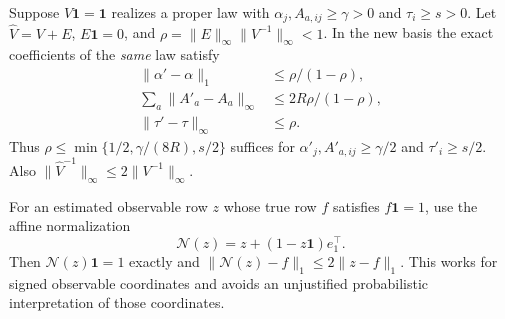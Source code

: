 \begin{lemma}
\label{II:U:lem:learned-basis}
Suppose $V\mathbf1=\mathbf1$ realizes a proper law with
$\alpha_j,A_{a,ij}\ge\gamma>0$ and $\tau_i\ge s>0$.
Let $\widehat V=V+E$, $E\mathbf1=0$, and
$\rho=\|E\|_\infty\|V^{-1}\|_\infty<1$.
In the new basis the exact coefficients of the \emph{same} law satisfy
\begin{align*}
 \|\alpha'-\alpha\|_1&\le\rho/(1-\rho),\\
 \sum_a\|A'_a-A_a\|_\infty&\le 2R\rho/(1-\rho),\\
 \|\tau'-\tau\|_\infty&\le\rho.
\end{align*}
Thus $\rho\le\min\{1/2,\gamma/(8R),s/2\}$ suffices for
$\alpha'_j,A'_{a,ij}\ge\gamma/2$ and $\tau'_i\ge s/2$.
Also $\|\widehat V^{-1}\|_\infty\le2\|V^{-1}\|_\infty$.
\end{lemma}


For an estimated observable row $z$ whose true row $f$ satisfies
$f\mathbf1=1$, use the affine normalization
\[
 \mathcal N(z)=z+(1-z\mathbf1)e_1^\top.
\]
Then $\mathcal N(z)\mathbf1=1$ exactly and
$\|\mathcal N(z)-f\|_1\le2\|z-f\|_1$. This works for signed
observable coordinates and avoids an unjustified probabilistic
interpretation of those coordinates.

